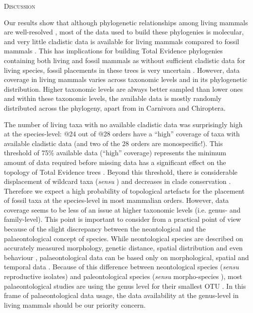 \documentclass[12pt,letterpaper]{article}
\renewcommand{\section}[1]{%
\bigskip
\begin{center}
\begin{Large}
\normalfont\scshape #1
\medskip
\end{Large}
\end{center}}
\begin{document}
%
%

\section{Discussion}
Our results show that although phylogenetic relationships among living mammals are well-resolved \citep[e.g.][]{FritzTree,meredithimpacts2011,May-Collado-PeerJ}, most of the data used to build these phylogenies is molecular, and very little cladistic data is available for living mammals compared to fossil mammals \citep[e.g.][]{O'Leary08022013,ni2013oldest}.
This has implications for building Total Evidence phylogenies containing both living and fossil mammals as without sufficient cladistic data for living species, fossil placements in these trees is very uncertain \citep{GuillermeCooper}.
However, data coverage in living mammals varies across taxonomic levels and in its phylogenetic distribution.
Higher taxonomic levels are always better sampled than lower ones and within these taxonomic levels, the available data is mostly randomly distributed across the phylogeny, apart from in Carnivora and Chiroptera.

The number of living taxa with no available cladistic data was surprisingly high at the species-level: @24 out of @28 orders have a ``high'' coverage of taxa with available cladistic data (and two of the 28 orders are monospecific!).
This threshold of 75\% available data (``high'' coverage) represents the minimum amount of data required before missing data has a significant effect on the topology of Total Evidence trees \citep{GuillermeCooper}.
Beyond this threshold, there is considerable displacement of wildcard taxa (\textit{sensu} \citep{kearneyfragmentary2002}) and decreases in clade conservation \citep{GuillermeCooper}.
Therefore we expect a high probability of topological artefacts for the placement of fossil taxa at the species-level in most mammalian orders.
However, data coverage seems to be less of an issue at higher taxonomic levels (i.e. genus- and family-level).
This point is important to consider from a practical point of view because of the slight discrepancy between the neontological and the palaeontological concept of species.
While neontological species are described on accurately measured morphology, genetic distance, spatial distribution and even behaviour \citep[e.g.][]{kellymolecular2014}, palaeontological data can be based only on morphological, spatial and temporal data \citep[e.g.][]{ni2013oldest}.
Because of this difference between neontological species (\textit{sensu} reproductive isolates) and paleontological species (\textit{sensu} morpho-species %
), most palaeontological studies are using the genus level for their smallest OTU \citep[e.g.][]{ni2013oldest,O'Leary08022013}.
In this frame of palaeontological data usage, the data availability at the genus-level in living mammals should be our priority concern.
\end{document}
